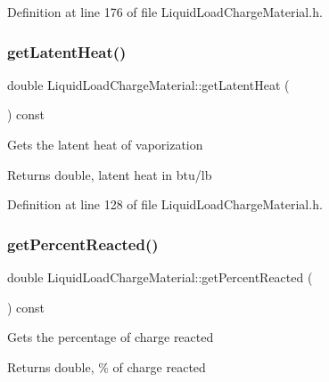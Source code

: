 Definition at line 176 of file Liquid\+Load\+Charge\+Material.\+h.

\mbox{\label{class_liquid_load_charge_material_aca3a38eb3343144042e9349b053da1bc}} 
\subsubsection{\texorpdfstring{get\+Latent\+Heat()}{getLatentHeat()}}
{\footnotesize\ttfamily double Liquid\+Load\+Charge\+Material\+::get\+Latent\+Heat (\begin{DoxyParamCaption}{ }\end{DoxyParamCaption}) const\hspace{0.3cm}{\ttfamily [inline]}}

Gets the latent heat of vaporization \begin{DoxyReturn}{Returns}
double, latent heat in btu/lb 
\end{DoxyReturn}


Definition at line 128 of file Liquid\+Load\+Charge\+Material.\+h.

\mbox{\label{class_liquid_load_charge_material_acfedb26800cbead9bf11c57e1356dd57}} 
\subsubsection{\texorpdfstring{get\+Percent\+Reacted()}{getPercentReacted()}}
{\footnotesize\ttfamily double Liquid\+Load\+Charge\+Material\+::get\+Percent\+Reacted (\begin{DoxyParamCaption}{ }\end{DoxyParamCaption}) const\hspace{0.3cm}{\ttfamily [inline]}}

Gets the percentage of charge reacted \begin{DoxyReturn}{Returns}
double, \% of charge reacted 
\end{DoxyReturn}


